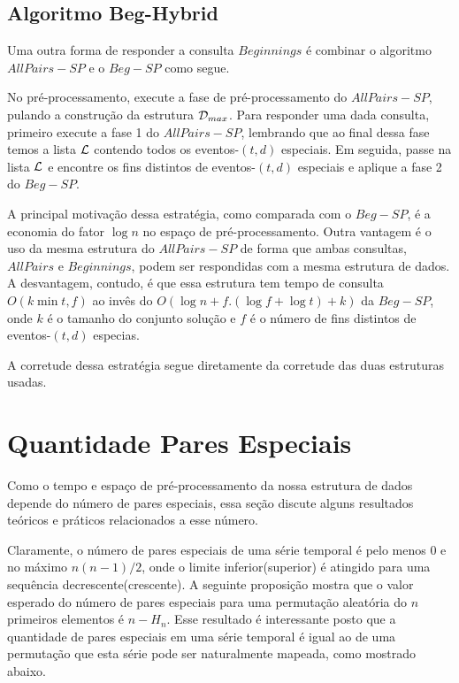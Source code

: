 \documentclass[12pt]{article}
\begin{document}
\subsection{Algoritmo Beg-Hybrid}

Uma outra forma de responder a consulta $Beginnings$ é combinar o algoritmo 
$AllPairs-SP$ e o $Beg-SP$ como segue. 

No pré-processamento, execute a fase de pré-processamento do $AllPairs-SP$, pulando
a construção da estrutura ${\cal D}_{max}$. Para responder uma dada consulta,
primeiro execute a fase 1 do $AllPairs-SP$, lembrando que ao final dessa fase
temos a lista ${\cal L}$ contendo todos os eventos-$(t,d)$ especiais. Em seguida,
passe na lista ${\cal L}$ e encontre os fins distintos de eventos-$(t,d)$ especiais e
aplique a fase 2 do $Beg-SP$. 

A principal motivação dessa estratégia, como comparada com o $Beg-SP$, é a economia
do fator $\log n$ no espaço de pré-processamento. Outra vantagem é o uso da mesma
estrutura do $AllPairs-SP$ de forma que ambas consultas, $AllPairs$ e $Beginnings$,
podem ser respondidas com a mesma estrutura de dados. A desvantagem, contudo,
é que essa estrutura tem tempo de consulta $O(k\min{t,f})$ ao invês do 
$O(\log n + f.(\log f + \log t) + k)$ da $Beg-SP$, onde $k$ é o tamanho
do conjunto solução e $f$ é o número de fins distintos de eventos-$(t,d)$
especias.

A corretude dessa estratégia segue diretamente da corretude das duas
estruturas usadas.

\section{Quantidade Pares Especiais}

Como o tempo e espaço de pré-processamento da nossa estrutura de dados
depende do número de pares especiais, essa seção discute alguns resultados
teóricos e práticos relacionados a esse número.

Claramente, o número de pares especiais de uma série temporal é pelo 
menos $0$ e no máximo $n(n - 1)/2$, onde o limite inferior(superior) é
atingido para uma sequência decrescente(crescente). A seguinte proposição
mostra que o valor esperado do número de pares especiais para uma permutação
aleatória do $n$ primeiros elementos é $n - H_n$. Esse resultado é interessante
posto que a quantidade de pares especiais em uma série temporal é igual ao de 
uma permutação que esta série pode ser naturalmente mapeada, como mostrado abaixo.
\end{document}
